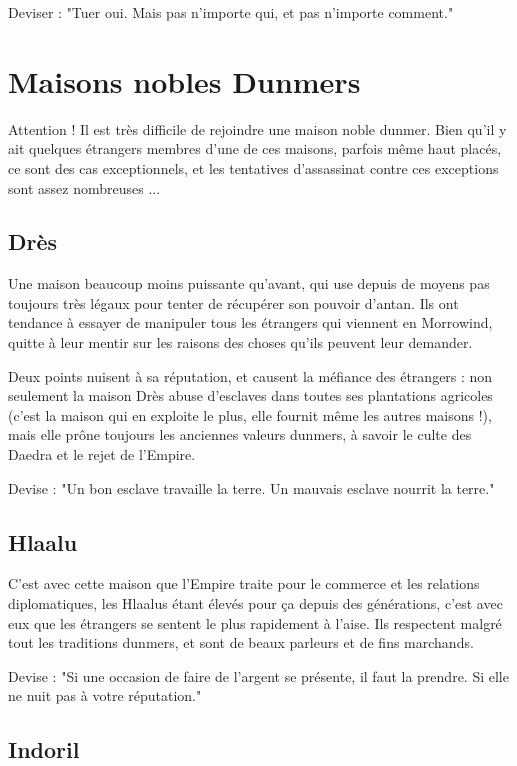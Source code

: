       Deviser : "Tuer oui. Mais pas n'importe qui, et pas n'importe comment."

  \section{Maisons nobles Dunmers}
  
    Attention ! Il est très difficile de rejoindre une maison noble dunmer. Bien qu'il y ait quelques étrangers membres d'une de ces maisons, parfois même haut placés, ce sont des cas exceptionnels, et les tentatives d'assassinat contre ces exceptions sont assez nombreuses ...

    \subsection{Drès}
  
      Une maison beaucoup moins puissante qu'avant, qui use depuis de moyens pas toujours très légaux pour tenter de récupérer son pouvoir d'antan. Ils ont tendance à essayer de manipuler tous les étrangers qui viennent en Morrowind, quitte à leur mentir sur les raisons des choses qu'ils peuvent leur demander.
      
      Deux points nuisent à sa réputation, et causent la méfiance des étrangers : non seulement la maison Drès abuse d'esclaves dans toutes ses plantations agricoles (c'est la maison qui en exploite le plus, elle fournit même les autres maisons !), mais elle prône toujours les anciennes valeurs dunmers, à savoir le culte des Daedra et le rejet de l'Empire.
      
      Devise : "Un bon esclave travaille la terre. Un mauvais esclave nourrit la terre."
    
    \subsection{Hlaalu}
    
      C'est avec cette maison que l'Empire traite pour le commerce et les relations diplomatiques, les Hlaalus étant élevés pour ça depuis des générations, c'est avec eux que les étrangers se sentent le plus rapidement à l'aise. Ils respectent malgré tout les traditions dunmers, et sont de beaux parleurs et de fins marchands.
      
      Devise : "Si une occasion de faire de l'argent se présente, il faut la prendre. Si elle ne nuit pas à votre réputation."
    
    \subsection{Indoril}
    
